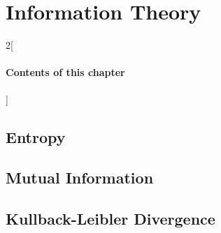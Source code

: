 \chapter{Information Theory}

\begin{multicols}{2}[\subsubsection*{Contents of this chapter}]
\end{multicols}

\section{Entropy}

\section{Mutual Information}

\section{Kullback-Leibler Divergence}
